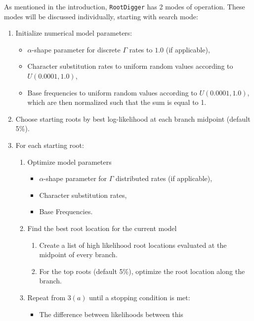 \documentclass{article}
\newcommand{\RootDiggertt}{\texttt{RootDigger}}
\begin{document}
As mentioned in the introduction, \RootDiggertt{} has 2 modes of operation.
These modes will be discussed individually, starting with search mode:

\begin{enumerate}
  \item Initialize numerical model parameters:
        \begin{itemize}
          \item $\alpha$-shape parameter for discrete $\Gamma$ rates to $1.0$
            (if applicable),
          \item Character substitution rates to uniform random values according
                to $U(0.0001, 1.0)$,
          \item Base frequencies to uniform random values according to
                $U(0.0001, 1.0)$, which are then normalized such that the sum is
                equal to 1.
        \end{itemize}
  \item Choose starting roots by best log-likelihood at each branch midpoint
    (default 5\%).
  \item For each starting root:
        \begin{enumerate}
          \item Optimize model parameters
                \begin{itemize}
                  \item $\alpha$-shape parameter for $\Gamma$ distributed rates
                    (if applicable),
                  \item Character substitution rates,
                  \item Base Frequencies.
                \end{itemize}
          \item Find the best root location for the current model
                \begin{enumerate}
                  \item Create a list of high likelihood root locations
                        evaluated at the midpoint of every branch.
                  \item For the top roots (default 5\%), optimize the root
                        location along the branch.
                \end{enumerate}
          \item Repeat from $3(a)$ until a stopping condition is met:
                \begin{itemize}
                  \item The difference between likelihoods between this

\end{itemize}
\end{enumerate}
\end{enumerate}
\end{document}

